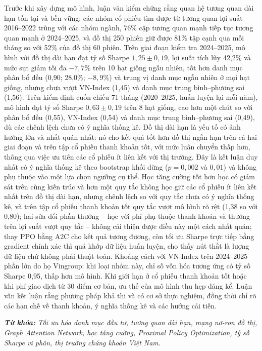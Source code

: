 {Trước khi xây dựng mô hình, luận văn kiểm chứng rằng quan hệ tương quan dài hạn tồn tại và bền vững: các nhóm cổ phiếu tìm được từ tương quan lợi suất 2016--2022 trùng với các nhóm ngành, 76\% cặp tương quan mạnh tiếp tục tương quan mạnh ở 2024--2025, và đồ thị 250 phiên giữ được 81\% tập cạnh qua mỗi tháng so với 52\% của đồ thị 60 phiên. Trên giai đoạn kiểm tra 2024--2025, mô hình với đồ thị dài hạn đạt tỷ số Sharpe $1{,}25\pm0{,}19$, lợi suất tích lũy 42,2\% và mức sụt giảm tối đa $-7{,}7\%$ trên 10 hạt giống ngẫu nhiên, tốt hơn danh mục phân bổ đều (0,90; 28,0\%; $-8{,}9\%$) và trung vị danh mục ngẫu nhiên ở mọi hạt giống, nhưng chưa vượt VN-Index (1,45) và danh mục trung bình--phương sai (1,56). Trên kiểm định cuốn chiếu 71 tháng (2020--2025, huấn luyện lại mỗi năm), mô hình đạt tỷ số Sharpe $0{,}63\pm0{,}19$ trên 8 hạt giống, cao hơn một chút so với phân bổ đều (0,55), VN-Index (0,54) và danh mục trung bình--phương sai (0,49), dù các chênh lệch chưa có ý nghĩa thống kê. Đồ thị dài hạn là yếu tố có ảnh hưởng lớn và nhất quán nhất: nó cho kết quả tốt hơn đồ thị ngắn hạn trên cả hai giai đoạn và trên tập cổ phiếu thanh khoản tốt, với mức luân chuyển thấp hơn, thông qua việc ưu tiên các cổ phiếu ít liên kết với thị trường. Đây là kết luận duy nhất có ý nghĩa thống kê theo bootstrap khối dừng ($p = 0{,}002$ và $0{,}01$) và không phụ thuộc vào một lựa chọn ngưỡng cụ thể. Học tăng cường tốt hơn học có giám sát trên cùng kiến trúc và hơn một quy tắc không học giữ các cổ phiếu ít liên kết nhất trên đồ thị dài hạn, nhưng chênh lệch so với quy tắc chưa có ý nghĩa thống kê, và trên tập cổ phiếu thanh khoản tốt quy tắc vượt mô hình rõ rệt (1,38 so với 0,80); hai sửa đổi phần thưởng -- học với phí phụ thuộc thanh khoản và thưởng trên lợi suất vượt quy tắc -- không cải thiện được điều này một cách nhất quán; thay PPO bằng A2C cho kết quả tương đương, còn tối ưu Sharpe trực tiếp bằng gradient chính xác thì quá khớp dữ liệu huấn luyện, cho thấy nút thắt là lượng dữ liệu chứ không phải thuật toán. Khoảng cách với VN-Index trên 2024--2025 phần lớn do họ Vingroup: khi loại nhóm này, chỉ số vốn hóa tương ứng có tỷ số Sharpe 0,95, thấp hơn mô hình. Khi giới hạn ở cổ phiếu thanh khoản tốt hoặc khi phí giao dịch từ 30 điểm cơ bản, ưu thế của mô hình thu hẹp đáng kể. Luận văn kết luận rằng phương pháp khả thi và có cơ sở thực nghiệm, đồng thời chỉ rõ các hạn chế về thanh khoản, ý nghĩa thống kê và các hướng cải tiến.

\medskip
\noindent\textbf{\textit{Từ khóa:}} \textit{Tối ưu hóa danh mục đầu tư, tương quan dài hạn, mạng nơ-ron đồ thị, Graph Attention Network, học tăng cường, Proximal Policy Optimization, tỷ số Sharpe vi phân, thị trường chứng khoán Việt Nam.}
}
